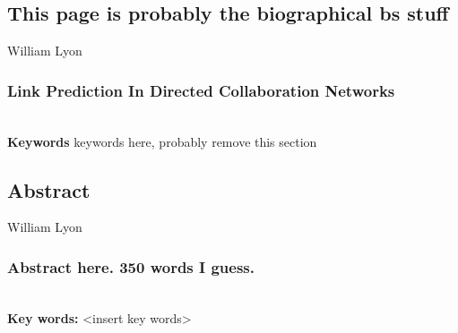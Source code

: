 
\subsection*{This page is probably the biographical bs stuff}

William Lyon
\subsubsection*{Link Prediction In Directed Collaboration Networks}


%
\mbox{}\\[0.5\baselineskip]\noindent
\textbf{Keywords} 
keywords here, probably remove this section
\clearpage
\subsection*{Abstract}

William Lyon
\subsubsection*{Abstract here. 350 words I guess.}


%
\mbox{}\\[0.5\baselineskip]\noindent
\textbf{Key words:} 
<insert key words>